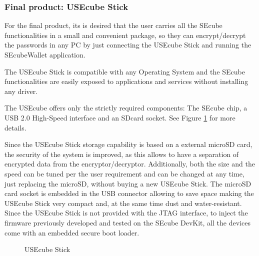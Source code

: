 \subsubsection{Final product: USEcube Stick}

For the final product, its is desired that the user carries all the SEcube functionalities in a small and convenient package, so they can encrypt/decrypt the passwords in any PC by just connecting the USEcube Stick and running the SEcubeWallet application.

The USEcube Stick is compatible with any Operating System and the SEcube functionalities are easily exposed to applications and services without installing any driver.

The USEcube offers only the strictly required components: The SEcube chip, a USB 2.0 High-Speed interface and an SDcard socket. See Figure \ref{fig:USEcube} for more details.


Since the USEcube Stick storage capability is based on a external microSD card, the security of the system is improved, as this allows to have a separation of encrypted data from the encryptor/decryptor. Additionally, both the size and the speed can be tuned per the user requirement and can be changed at any time, just replacing the microSD, without buying a new USEcube Stick.
The microSD card socket is embedded in the USB connector allowing to save space making the USEcube Stick very compact and, at the same time dust
and water-resistant.
Since the USEcube Stick is not provided with the JTAG interface, to inject the firmware previously developed and tested on the SEcube DevKit, all the devices come with an embedded secure boot loader.


\begin{figure}[ht]
  \centering
  \caption{USEcube Stick}
 \label{fig:USEcube}
\end{figure}


